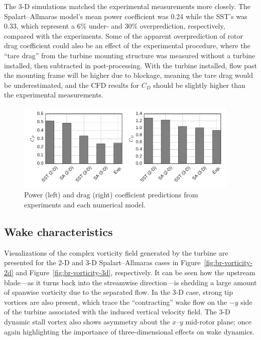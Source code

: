\documentclass[aip,graphicx]{revtex4-1}
\begin{document}
The 3-D simulations matched the experimental measurements more closely. The
Spalart--Allmaras model's mean power coefficient was 0.24 while the SST's was
0.33, which represent a 6\% under- and 30\% overprediction, respectively,
compared with the experiments. Some of the apparent overprediction of rotor drag
coefficient could also be an effect of the experimental procedure, where the
``tare drag'' from the turbine mounting structure was measured without a turbine
installed, then subtracted in post-processing. With the turbine installed, flow
past the mounting frame will be higher due to blockage, meaning the tare drag
would be underestimated, and the CFD results for $C_D$ should be slightly higher
than the experimental measurements.

\begin{figure}
    \centering

    \includegraphics[width=0.95\textwidth]{perf_bar_chart}

    \caption{Power (left) and drag (right) coefficient predictions from
        experiments and each numerical model.}

    \label{fig:br-cfd-perf-bar-chart}
\end{figure}


\subsection{Wake characteristics}

Visualizations of the complex vorticity field generated by the turbine are
presented for the 2-D and 3-D Spalart--Allmaras cases in
Figure~\ref{fig:br-vorticity-2d} and Figure~\ref{fig:br-vorticity-3d},
respectively. It can be seen how the upstream blade---as it turns back into the
streamwise direction---is shedding a large amount of spanwise vorticity due to
the separated flow. In the 3-D case, strong tip vortices are also present, which
trace the ``contracting'' wake flow on the $-y$ side of the turbine associated
with the induced vertical velocity field. The 3-D dynamic stall vortex also
shows asymmetry about the $x$--$y$ mid-rotor plane; once again highlighting the
importance of three-dimensional effects on wake dynamics.
\end{document}
